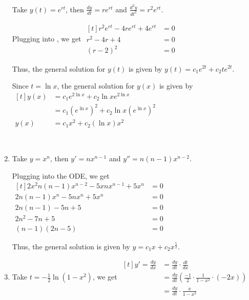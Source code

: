 \documentclass[11pt,fleqn]{book} %
\begin{document}
\begin{enumerate}
    Take $y(t) = e^{rt}$, then $\frac{dy}{dt} = re^{rt}$ and $\frac{d^2y}{dt^2} = r^2e^{rt}$. 

    Plugging into , we get $\begin{aligned}[t]
        r^2e^{rt} - 4re^{rt} + 4e^{rt} & = 0 \\
        r^2 - 4r + 4                   & = 0 \\
        (r - 2)^2                      & = 0
    \end{aligned}$

    Thus, the general solution for $y(t)$ is given by $y(t) = c_1e^{2t} + c_2te^{2t}$. 

    Since $t = \ln x$, the general solution for $y(x)$ is given by $\begin{aligned}[t]
        y(x) & = c_1e^{2\ln{x}} + c_2 \ln{x} e^{2\ln{x}}                                  \\
             & = c_1 \left( e^{\ln{x}} \right)^2 + c_2 \ln{x} \left( e^{\ln{x}} \right)^2 \\
        y(x) & = c_1 x^2 + c_2 (\ln{x}) x^2
    \end{aligned}$

    {~~~}

    \item Take $y = x^n$, then $y' = nx^{n-1}$ and $y'' = n(n - 1)x^{n-2}$.
    
    Plugging into the ODE, we get $\begin{aligned}[t]
        2x^2n(n-1)x^{n-2} - 5xnx^{n-1} + 5x^n & = 0 \\
        2n(n - 1)x^n - 5nx^n + 5x^n           & = 0 \\
        2n(n - 1) - 5n + 5                    & = 0 \\
        2n^2 - 7n + 5                         & = 0 \\
        (n - 1)(2n - 5)                       & = 0
    \end{aligned}$

    Thus, the general solution is given by $y = c_1 x + c_2 x^{\frac{5}{2}}$. 

    \item Take $t = -\frac{1}{2} \ln(1 - x^2)$, we get $\begin{aligned}[t]
        y' = \frac{dy}{dx} & = \frac{dy}{dt} \cdot \frac{dt}{dx}                      \\
                           & = \frac{dy}{dt} \left( \frac{-1}{2} \cdot \frac{1}{1 - x^2} \cdot (-2x) \right) \\
                           & = \frac{dy}{dt} \cdot \frac{x}{1 - x^2}
    \end{aligned}$
        

\end{enumerate}
\end{document}
